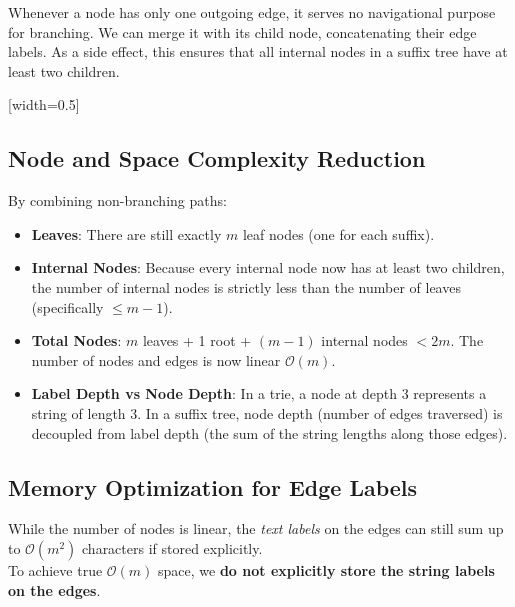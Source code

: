 Whenever a node has only one outgoing edge, it serves no navigational purpose for branching. We can merge it with its child node, concatenating their edge labels. As a side effect, this ensures that all internal nodes in a suffix tree have at least two children.

[width=0.5\textwidth]

\subsection{Node and Space Complexity Reduction}
By combining non-branching paths:
\begin{itemize}
    \item \textbf{Leaves}: There are still exactly \(m\) leaf nodes (one for each suffix).
    \item \textbf{Internal Nodes}: Because every internal node now has at least two children, the number of internal nodes is strictly less than the number of leaves (specifically \(\le m-1\)).
    \item \textbf{Total Nodes}: \(m\) leaves + 1 root + \((m-1)\) internal nodes \(< 2m\). The number of nodes and edges is now linear \(\mathcal{O}(m)\).
    \item \textbf{Label Depth vs Node Depth}: In a trie, a node at depth 3 represents a string of length 3. In a suffix tree, node depth (number of edges traversed) is decoupled from label depth (the sum of the string lengths along those edges).
\end{itemize}

\subsection{Memory Optimization for Edge Labels}

While the number of nodes is linear, the \textit{text labels} on the edges can still sum up to \(\mathcal{O}(m^2)\) characters if stored explicitly.\\
\sta To achieve true \(\mathcal{O}(m)\) space, we \textbf{do not explicitly store the string labels on the edges}.


